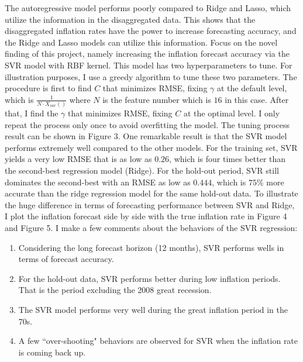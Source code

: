 \documentclass[10pt,twocolumn,letterpaper]{article}
\begin{document}
The autoregressive model performs poorly compared to Ridge and Lasso, which utilize the information in the disaggregated data. This shows that the disaggregated inflation rates have the power to increase forecasting accuracy, and the Ridge and Lasso models can utilize this information. Focus on the novel finding of this project, namely increasing the inflation forecast accuracy via the SVR model with RBF kernel. This model has two hyperparameters to tune. For illustration purposes, I use a greedy algorithm to tune these two parameters. The procedure is first to find $C$ that minimizes RMSE, fixing $\gamma$ at the default level, which is $\frac{1}{N \cdot X_{var}()}$ where $N$ is the feature number which is $16$ in this case. After that, I find the $\gamma$ that minimizes RMSE, fixing $C$ at the optimal level. I only repeat the process only once to avoid overfitting the model. The tuning process result can be shown in Figure 3. One remarkable result is that the SVR model performs extremely well compared to the other models. For the training set, SVR yields a very low RMSE that is as low as $0.26$, which is four times better than the second-best regression model (Ridge). For the hold-out period, SVR still dominates the second-best with an RMSE as low as $0.444$, which is $75\%$ more accurate than the ridge regression model for the same hold-out data. To illustrate the huge difference in terms of forecasting performance between SVR and Ridge, I plot the inflation forecast side by side with the true inflation rate in Figure 4 and Figure 5. I make a few comments about the behaviors of the SVR regression:

\begin{enumerate}
\itemsep0em 
\item Considering the long forecast horizon (12 months), SVR performs wells in terms of forecast accuracy. 
\item For the hold-out data, SVR performs better during low inflation periods. That is the period excluding the 2008 great recession. 
\item The SVR model performs very well during the great inflation period in the 70s.
\item A few ``over-shooting" behaviors are observed for SVR when the inflation rate is coming back up. 
\end{enumerate}
\end{document}
